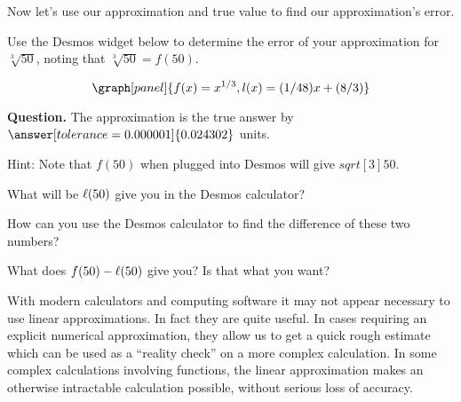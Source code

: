 \documentclass[handout,nooutcomes]{ximera}
\begin{document}
\begin{example}
\begin{explanation}
Now let's use our approximation and true value to find our approximation's error.


Use the Desmos widget below to determine the error of your approximation for $\sqrt[3]{50}$, noting that $\sqrt[3]{50} = f(50)$.

\[
\graph[panel]{f(x) = x^{1/3}, l(x) = (1/48) x + (8/3)}
\]

\textbf{Question. } The approximation is  the true 
answer by $\answer[tolerance=0.000001]{0.024302}$ units.

\begin{expandable}
Hint: Note that $f(50)$ when plugged into Desmos will give $sqrt[3]{50}$.
\begin{expandable}
What will be $\ell(50)$ give you in the Desmos calculator?
\begin{expandable}
How can you use the Desmos calculator to find the difference of these two numbers?
\begin{expandable}
What does $f(50)-\ell(50)$ give you? Is that what you want?
\end{expandable}
\end{expandable}
\end{expandable}
\end{expandable}

\end{explanation}
\end{example}

With modern calculators and computing software it may not appear
necessary to use linear approximations. In fact they are quite
useful. In cases requiring an explicit numerical approximation, they
allow us to get a quick rough estimate which can be used as a
``reality check'' on a more complex calculation. In some complex
calculations involving functions, the linear approximation makes an
otherwise intractable calculation possible, without serious loss of
accuracy.
\end{document}
